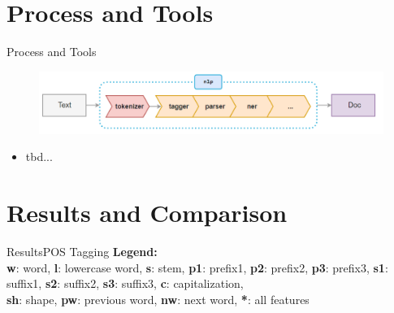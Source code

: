 \section{Process and Tools}

\begin{frame}{Process and Tools}{}
	\begin{figure}
		\includegraphics[scale=0.4]{img/nlp_pipeline}
	\end{figure}

	\begin{itemize}
		\item tbd...
	\end{itemize}
\end{frame}


\section{Results and Comparison}

\begin{frame}{Results}{POS Tagging}
	\tiny \textbf{Legend:} \\
	\textbf{w}: word, \textbf{l}: lowercase word, \textbf{s}: stem, \textbf{p1}: prefix1, \textbf{p2}: prefix2,
	\textbf{p3}: prefix3, \textbf{s1}: suffix1, \textbf{s2}: suffix2, \textbf{s3}: suffix3, \textbf{c}: capitalization, \\
	\textbf{sh}: shape, \textbf{pw}: previous word, \textbf{nw}: next word, \textbf{*}: all features
\end{frame}


